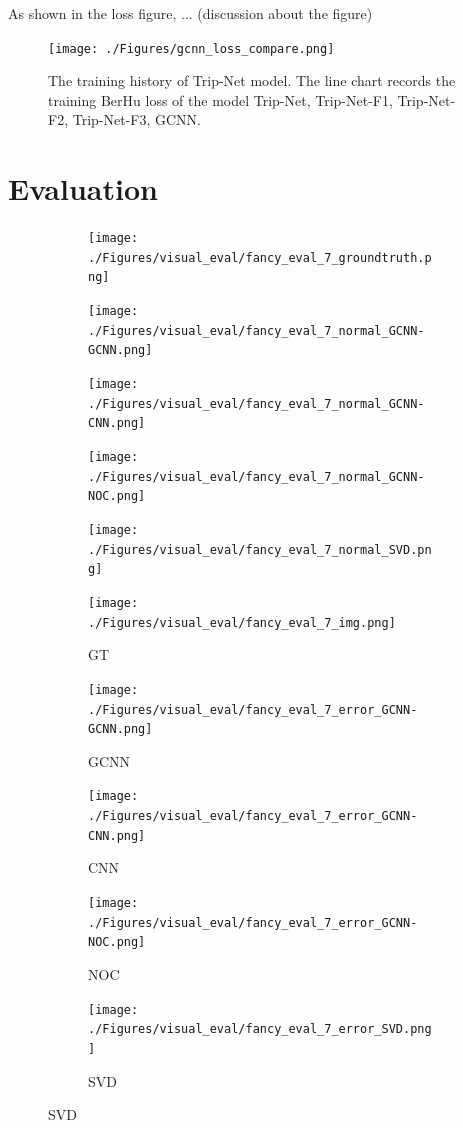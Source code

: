 \documentclass[border=15pt, multi, tikz]{article}
\begin{document}
As shown in the loss figure, ... (discussion about the figure)

\begin{figure}[th]
	\centering
	\texttt{[image: ./Figures/gcnn\_loss\_compare.png]}
	\caption{The training history of Trip-Net model. The line chart records the training BerHu loss of the model Trip-Net, Trip-Net-F1, Trip-Net-F2, Trip-Net-F3, GCNN.}
	\label{fig:trip-net-training-history}
\end{figure}


\section{Evaluation}

\begin{figure}[H]
	\centering
	\begin{subfigure}[b]{0.18\linewidth}
		\texttt{[image: ./Figures/visual\_eval/fancy\_eval\_7\_groundtruth.png]}
	\end{subfigure}
	\begin{subfigure}[b]{0.18\linewidth}
		\texttt{[image: ./Figures/visual\_eval/fancy\_eval\_7\_normal\_GCNN-GCNN.png]}
	\end{subfigure}
	\begin{subfigure}[b]{0.18\linewidth}
		\texttt{[image: ./Figures/visual\_eval/fancy\_eval\_7\_normal\_GCNN-CNN.png]}
	\end{subfigure}
	\begin{subfigure}[b]{0.18\linewidth}
		\texttt{[image: ./Figures/visual\_eval/fancy\_eval\_7\_normal\_GCNN-NOC.png]}
	\end{subfigure}
	\begin{subfigure}[b]{0.18\linewidth}
		\texttt{[image: ./Figures/visual\_eval/fancy\_eval\_7\_normal\_SVD.png]}
	\end{subfigure}
	
	\begin{subfigure}[b]{0.18\linewidth}
		\texttt{[image: ./Figures/visual\_eval/fancy\_eval\_7\_img.png]}
		\caption{GT}
	\end{subfigure}
	\begin{subfigure}[b]{0.18\linewidth}
		\texttt{[image: ./Figures/visual\_eval/fancy\_eval\_7\_error\_GCNN-GCNN.png]}
		\caption{GCNN}
	\end{subfigure}
	\begin{subfigure}[b]{0.18\linewidth}
		\texttt{[image: ./Figures/visual\_eval/fancy\_eval\_7\_error\_GCNN-CNN.png]}
		\caption{CNN}
	\end{subfigure}
	\begin{subfigure}[b]{0.18\linewidth}
		\texttt{[image: ./Figures/visual\_eval/fancy\_eval\_7\_error\_GCNN-NOC.png]}
		\caption{NOC}
	\end{subfigure}
	\begin{subfigure}[b]{0.18\linewidth}
		\texttt{[image: ./Figures/visual\_eval/fancy\_eval\_7\_error\_SVD.png]}
		\caption{SVD}
	\end{subfigure}
	

\end{figure}
\end{document}
